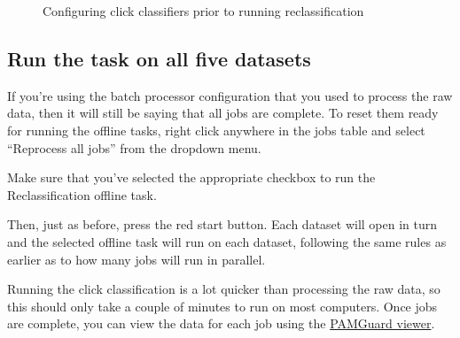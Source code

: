 \documentclass[
]{article}
\begin{document}
\begin{figure}
\begin{minipage}{0.55\linewidth}
{}


\end{minipage}%

\caption{\label{fig-reclass}Configuring click classifiers prior to
running reclassification}

\end{figure}%

\subsection{Run the task on all five
datasets}\label{run-the-task-on-all-five-datasets}

If you're using the batch processor configuration that you used to
process the raw data, then it will still be saying that all jobs are
complete. To reset them ready for running the offline tasks, right click
anywhere in the jobs table and select ``Reprocess all jobs'' from the
dropdown menu.

Make sure that you've selected the appropriate checkbox to run the
Reclassification offline task.

Then, just as before, press the red start button. Each dataset will open
in turn and the selected offline task will run on each dataset,
following the same rules as earlier as to how many jobs will run in
parallel.

Running the click classification is a lot quicker than processing the
raw data, so this should only take a couple of minutes to run on most
computers. Once jobs are complete, you can view the data for each job
using the
\href{https://www.pamguard.org/olhelp/overview/PamMasterHelp/docs/viewerMode.html}{PAMGuard
viewer}.
\end{document}
